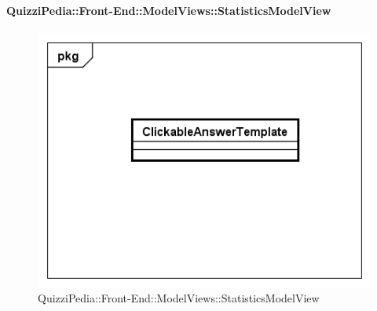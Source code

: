\paragraph{QuizziPedia::Front-End::ModelViews::StatisticsModelView}

\label{QuizziPedia::Front-End::ModelViews::StatisticsModelView}

\begin{figure}[ht]
	\centering
	\includegraphics[scale=0.5,keepaspectratio]{UML/Classi/Front-End/QuizziPedia_Front-end_Templates_ClickableAnswerTemplate.png}
	\caption{QuizziPedia::Front-End::ModelViews::StatisticsModelView}
\end{figure} \FloatBarrier

